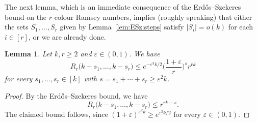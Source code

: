 \documentclass[12pt,reqno]{amsart}
\newtheorem{lemma}[theorem]{Lemma}
\theoremstyle{definition}
\theoremstyle{remark}
\newcommand\N{\mathbb{N}}
\def\Pr{\mathbb{P}}
\newcommand\eps{\varepsilon}
\renewcommand{\le}{\leqslant}
\renewcommand{\ge}{\geqslant}
\def\eps{\varepsilon}
\def\N{\mathbb{N}}
\begin{document}
The next lemma, which is an immediate consequence of the Erd\H{o}s--Szekeres bound on the $r$-colour Ramsey numbers, implies (roughly speaking) that either the sets $S_1,\dots,S_r$ given by Lemma~\ref{lem:ESz:steps} satisfy $|S_i| = o(k)$ for each $i \in [r]$, or we are already done.

\begin{lemma}\label{lem:many:ESz:steps}
Let\/ $k,r \ge 2$ and\/ $\eps \in (0,1)$. We have 
$$R_r\big( k - s_1, \ldots, k - s_r \big) \le e^{-\eps^3 k / 2} \bigg( \frac{1+\eps}{r} \bigg)^s r^{rk}$$
for every $s_1,\ldots,s_r \in [k]$ with\/ $s = s_1 + \cdots + s_r \ge \eps^2 k$.
\end{lemma}

\begin{proof}
By the Erd\H{o}s--Szekeres bound, we have
$$R_r\big( k - s_1, \ldots, k - s_r \big) \le r^{rk - s}.$$
The claimed bound follows, since $( 1 + \eps )^{\eps^2 k} \ge e^{\eps^3 k/2}$ for every $\eps \in (0,1)$.
\end{proof}




\end{document}
